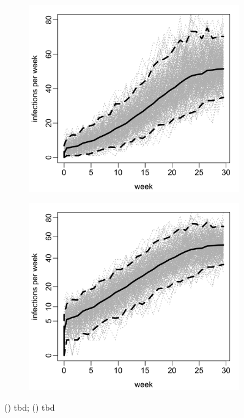 \documentclass{uwstat572}
\begin{document}
\begin{figure}[H]
	\centering
	\begin{subfigure}[b]{0.49\textwidth}
		\includegraphics[width=\textwidth]{figures/figure_4b_all_plants.png}
		\caption{}
		\label{fig:all_infections}
	\end{subfigure}
	\hfill
	\begin{subfigure}[b]{0.49\textwidth}
		\includegraphics[width=\textwidth]{figures/figure_4b_all_plants_root.png}
		\caption{}
		\label{fig:root_all_infections}
	\end{subfigure}
	\caption{() tbd; () tbd }
	\label{fig:full_field_sim}
\end{figure} 
\end{document}
